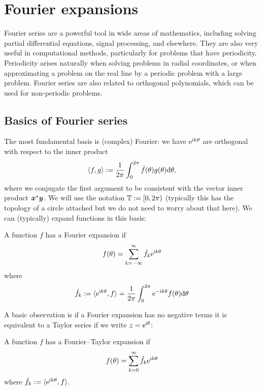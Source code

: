 
\section{Fourier expansions}
Fourier series are a powerful tool in wide areas of mathematics, including solving partial differential equations, signal processing, and elsewhere. They are also very useful in computational methods, particularly for problems that have periodicity. Periodicity arises naturally when solving problems in radial coordinates, or when approximating a problem on the real line by a periodic problem with a large problem. Fourier series are also related to orthogonal polynomials, which can be used for non-periodic problems.

\subsection{Basics of Fourier series}
The most fundamental basis is (complex) Fourier: we have ${\rm e}^{{\rm i} k \ensuremath{\theta}}$ are orthogonal with respect to the inner product
\[
\ensuremath{\langle}f, g \ensuremath{\rangle} := {1 \over 2\ensuremath{\pi}} \ensuremath{\int}_0^{2\ensuremath{\pi}} \bar f(\ensuremath{\theta}) g(\ensuremath{\theta}) {\rm d}\ensuremath{\theta},
\]
where we conjugate the first argument to be consistent with the vector inner product $\bm{{\mbox{\boldmath$x$\unboldmath}}}^\star \bm{{\mbox{\boldmath$y$\unboldmath}}}$. We will use the notation ${\mathbb T} := [0,2\pi)$ (typically this has the topology of a circle attached but we do not need to worry about that here). We can (typically) expand functions in this basis:

\begin{definition}[Fourier] A function $f$ has a Fourier expansion if
\[
f(\ensuremath{\theta}) = \ensuremath{\sum}_{k = -\ensuremath{\infty}}^\ensuremath{\infty} \hat f_k {\rm e}^{{\rm i} k \ensuremath{\theta}}
\]
where
\[
\hat f_k := \ensuremath{\langle}{\rm e}^{{\rm i} k \ensuremath{\theta}}, f\ensuremath{\rangle} = {1 \over 2\ensuremath{\pi}} \ensuremath{\int}_0^{2\ensuremath{\pi}}  {\rm e}^{-{\rm i} k \ensuremath{\theta}} f(\ensuremath{\theta}) {\rm d}\ensuremath{\theta}
\]
\end{definition}

A basic observation is if a Fourier expansion has no negative terms it is equivalent to a Taylor series if we write $z = {\rm e}^{{\rm i} \ensuremath{\theta}}$:

\begin{definition} A function $f$ has a Fourier\ensuremath{\endash}Taylor expansion if
\[
f(\ensuremath{\theta}) = \ensuremath{\sum}_{k = 0}^\ensuremath{\infty} \hat f_k {\rm e}^{{\rm i} k \ensuremath{\theta}}
\]
where $\hat f_k := \ensuremath{\langle}{\rm e}^{{\rm i} k \ensuremath{\theta}}, f\ensuremath{\rangle}$. \end{definition}

